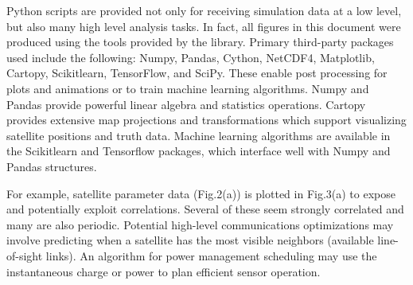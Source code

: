 \documentclass[conference]{IEEEtran}
\begin{document}
Python scripts are provided not only for receiving simulation data at a low
level, but also many high level analysis tasks.  In fact, all figures in this
document were produced using the tools provided by the library.  Primary
third-party packages used include the following: Numpy, Pandas, Cython, NetCDF4,
Matplotlib, Cartopy, Scikitlearn, TensorFlow, and SciPy.  These enable post
processing for plots and animations or to train machine learning algorithms.
Numpy and Pandas provide powerful linear algebra and statistics operations.
Cartopy provides extensive map projections and transformations which support
visualizing satellite positions and truth data.  Machine learning algorithms are
available in the Scikitlearn and Tensorflow packages, which interface well with
Numpy and Pandas structures.

For example, satellite parameter data (Fig.2(a)) is plotted in Fig.3(a) to
expose and potentially exploit correlations.  Several of these seem strongly
correlated and many are also periodic.  Potential high-level communications
optimizations may involve predicting when a satellite has the most visible
neighbors (available line-of-sight links).  An algorithm for power management
scheduling may use the instantaneous charge or power to plan efficient sensor
operation.
\end{document}
